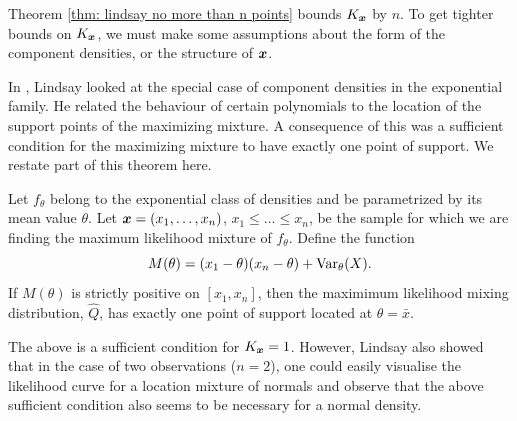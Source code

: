 	Theorem \ref{thm: lindsay no more than n points} bounds $K_{\bm{{x}}}$ by $n$. To get tighter bounds on $K_{\bm{{x}}}$, we must make some assumptions about the form of the component densities, or the structure of ${\bm{{x}}}$.

	In \cite{Lindsay1983a-he}, Lindsay looked at the special case of component densities in the exponential family. He related the behaviour of certain polynomials to the location of the support points of the maximizing mixture. A consequence of this was a sufficient condition for the maximizing mixture to have exactly one point of support. We restate part of this theorem here.

	\begin{theorem}
	\label{thm:exponential family k=1 bound}
		Let $f_\theta$ belong to the exponential class of densities and be parametrized by its mean value $\theta$. Let ${\bm{{x}}} = (x_1, \dots, x_n)$, $x_1 \leq \dots \leq x_n$, be the sample for which we are finding the maximum likelihood mixture of $f_\theta$. Define the function
		\begin{equation}
			M(\theta) = (x_1 - \theta)(x_n - \theta) + \mathrm{Var}_\theta(X).
		\end{equation}
		If $M(\theta)$ is strictly positive on $[x_1, x_n]$, then the maximimum likelihood mixing distribution, $\hat{Q}$, has exactly one point of support located at $\theta = \bar{x}$.
	\end{theorem}

	The above is a sufficient condition for $K_{\bm{{x}}} = 1$. However, Lindsay also showed that in the case of two observations ($n=2$), one could easily visualise the likelihood curve for a location mixture of normals and observe that the above sufficient condition also seems to be necessary for a normal density. 

